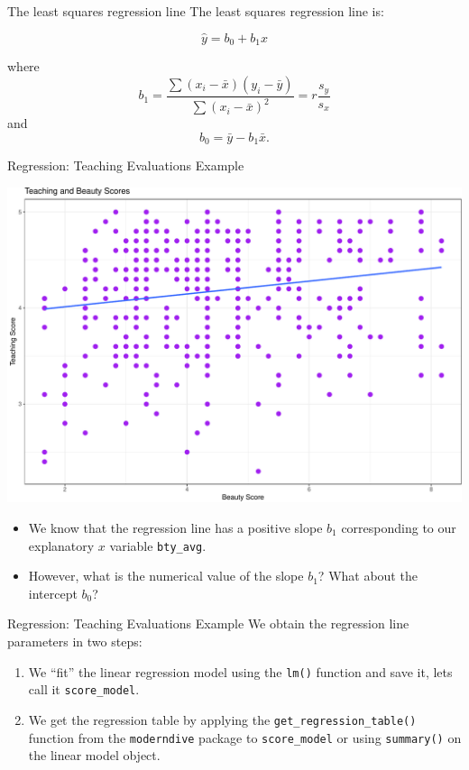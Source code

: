 \documentclass[
  ignorenonframetext,
]{beamer}
\begin{document}
\begin{frame}{The least squares regression line}
\protect\hypertarget{the-least-squares-regression-line}{}
The least squares regression line is:

\[\hat{y}=b_0+b_1x\]

where
\[b_1=\frac{\sum(x_i-\bar{x})(y_i-\bar{y})}{\sum(x_i-\bar{x})^2}=r \frac{s_y}{s_x}\]
and \[b_0=\bar{y}-b_1\bar{x}.\]
\end{frame}

\begin{frame}[fragile]{Regression: Teaching Evaluations Example}
\protect\hypertarget{regression-teaching-evaluations-example}{}
\begin{center}\includegraphics[width=0.6\linewidth,height=0.45\textheight]{Week4_Lect_files/figure-beamer/unnamed-chunk-18-1} \end{center}

\begin{itemize}
\item
  We know that the regression line has a positive slope \(b_1\)
  corresponding to our explanatory \(x\) variable \texttt{bty\_avg}.
\item
  However, what is the numerical value of the slope \(b_1\)? What about
  the intercept \(b_0\)?
\end{itemize}
\end{frame}

\begin{frame}[fragile]{Regression: Teaching Evaluations Example}
\protect\hypertarget{regression-teaching-evaluations-example-1}{}
We obtain the regression line parameters in two steps:

\begin{enumerate}
\item
  We ``fit'' the linear regression model using the \texttt{lm()}
  function and save it, lets call it \texttt{score\_model}.
\item
  We get the regression table by applying the
  \texttt{get\_regression\_table()} function from the
  \texttt{moderndive} package to \texttt{score\_model} or using
  \texttt{summary()} on the linear model object.
\end{enumerate}
\end{frame}
\end{document}
